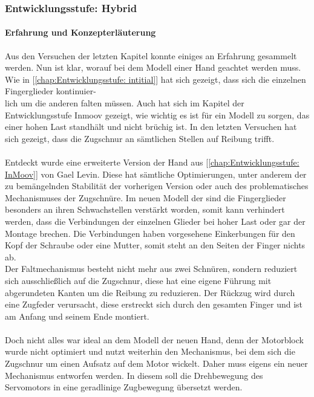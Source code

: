 \documentclass[titlepage,12pt,twoside]{article}
\begin{document}
\subsubsection{Entwicklungsstufe: Hybrid} 
\label{chap:Entwicklungsstufe: Hybrid}
\paragraph{Erfahrung und Konzepterläuterung}
\hfill \break
\hfill \break
Aus den Versuchen der letzten Kapitel konnte einiges an Erfahrung gesammelt werden. Nun ist klar, worauf bei dem Modell einer Hand geachtet werden muss. \\
Wie in [\textcolor{blue}{\autoref{chap:Entwicklungsstufe: intitial}}] hat sich gezeigt, dass sich die einzelnen Fingerglieder kontinuier-\\lich um die anderen falten müssen. Auch hat sich im Kapitel der Entwicklungsstufe Inmoov gezeigt, wie wichtig es ist für ein Modell zu sorgen, das einer hohen 
Last standhält und nicht brüchig ist. In den letzten Versuchen hat sich gezeigt, dass die Zugschnur an sämtlichen Stellen auf Reibung trifft. \\
\\
Entdeckt wurde eine erweiterte Version der Hand aus [\textcolor{blue}{\autoref{chap:Entwicklungsstufe: InMoov}}] von Gael Levin. Diese hat sämtliche Optimierungen, unter anderem der zu bemängelnden Stabilität der vorherigen Version oder auch des problematisches Mechanismuses der 
Zugschnüre. Im neuen Modell der  sind die Fingerglieder besonders an ihren Schwachstellen verstärkt worden, somit kann verhindert werden, dass die Verbindungen der einzelnen Glieder bei hoher Last oder gar der Montage brechen. Die 
Verbindungen haben vorgesehene Einkerbungen für den Kopf der Schraube oder eine Mutter, somit steht an den Seiten der Finger nichts ab. \\
Der Faltmechanismus besteht nicht mehr aus zwei Schnüren, sondern reduziert sich ausschließlich auf die Zugschnur, diese hat eine eigene Führung mit abgerundeten Kanten um die Reibung zu reduzieren. Der Rückzug wird durch eine Zugfeder verursacht, 
diese erstreckt sich durch den gesamten Finger und ist am Anfang und seinem Ende montiert. \\
\\
Doch nicht alles war ideal an dem Modell der neuen Hand, denn der Motorblock wurde nicht optimiert und nutzt weiterhin den Mechanismus, bei dem sich die Zugschnur um einen Aufsatz auf dem Motor wickelt. Daher muss eigens ein neuer Mechanismus 
entworfen werden. In diesem soll die Drehbewegung des Servomotors in eine geradlinige Zugbewegung übersetzt werden. \\
\\
\newpage
\end{document}
